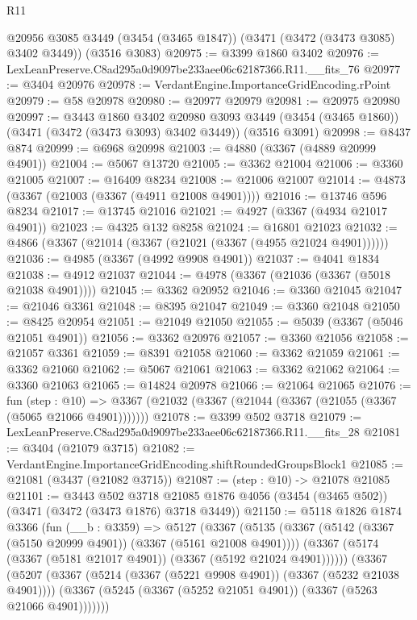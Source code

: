 \begin{lexlean}{R11}
\begin{coremodule}
    @20956
    @3085
    @3449
    (@3454 (@3465 @1847))
    (@3471 (@3472 (@3473 @3085) @3402 @3449))
    (@3516 @3083)
@20975 := @3399 @1860 @3402
@20976 := LexLeanPreserve.C8ad295a0d9097be233aee06c62187366.R11.__fits_76
@20977 := @3404 @20976
@20978 := VerdantEngine.ImportanceGridEncoding.rPoint
@20979 := @58 @20978
@20980 := @20977 @20979
@20981 := @20975 @20980
@20997 := @3443
    @1860
    @3402
    @20980
    @3093
    @3449
    (@3454 (@3465 @1860))
    (@3471 (@3472 (@3473 @3093) @3402 @3449))
    (@3516 @3091)
@20998 := @8437 @874
@20999 := @6968 @20998
@21003 := @4880 (@3367 (@4889 @20999 @4901))
@21004 := @5067 @13720
@21005 := @3362 @21004
@21006 := @3360 @21005
@21007 := @16409 @8234
@21008 := @21006 @21007
@21014 := @4873 (@3367 (@21003 (@3367 (@4911 @21008 @4901))))
@21016 := @13746 @596 @8234
@21017 := @13745 @21016
@21021 := @4927 (@3367 (@4934 @21017 @4901))
@21023 := @4325 @132 @8258
@21024 := @16801 @21023
@21032 := @4866 (@3367 (@21014 (@3367 (@21021 (@3367 (@4955 @21024 @4901))))))
@21036 := @4985 (@3367 (@4992 @9908 @4901))
@21037 := @4041 @1834
@21038 := @4912 @21037
@21044 := @4978 (@3367 (@21036 (@3367 (@5018 @21038 @4901))))
@21045 := @3362 @20952
@21046 := @3360 @21045
@21047 := @21046 @3361
@21048 := @8395 @21047
@21049 := @3360 @21048
@21050 := @8425 @20954
@21051 := @21049 @21050
@21055 := @5039 (@3367 (@5046 @21051 @4901))
@21056 := @3362 @20976
@21057 := @3360 @21056
@21058 := @21057 @3361
@21059 := @8391 @21058
@21060 := @3362 @21059
@21061 := @3362 @21060
@21062 := @5067 @21061
@21063 := @3362 @21062
@21064 := @3360 @21063
@21065 := @14824 @20978
@21066 := @21064 @21065
@21076 := fun (step : @10) =>
  @3367 (@21032 (@3367 (@21044 (@3367 (@21055 (@3367 (@5065 @21066 @4901)))))))
@21078 := @3399 @502 @3718
@21079 := LexLeanPreserve.C8ad295a0d9097be233aee06c62187366.R11.__fits_28
@21081 := @3404 (@21079 @3715)
@21082 := VerdantEngine.ImportanceGridEncoding.shiftRoundedGroupsBlock1
@21085 := @21081 (@3437 (@21082 @3715))
@21087 := (step : @10) -> @21078 @21085
@21101 := @3443
    @502
    @3718
    @21085
    @1876
    @4056
    (@3454 (@3465 @502))
    (@3471 (@3472 (@3473 @1876) @3718 @3449))
@21150 := @5118
    @1826
    @1874
    @3366
    (fun (__b : @3359) =>
    @5127
      (@3367
        (@5135
          (@3367 (@5142 (@3367 (@5150 @20999 @4901)) (@3367 (@5161 @21008 @4901))))
          (@3367 (@5174 (@3367 (@5181 @21017 @4901)) (@3367 (@5192 @21024 @4901))))))
      (@3367
        (@5207
          (@3367 (@5214 (@3367 (@5221 @9908 @4901)) (@3367 (@5232 @21038 @4901))))
          (@3367 (@5245 (@3367 (@5252 @21051 @4901)) (@3367 (@5263 @21066 @4901)))))))

\end{coremodule}
\end{lexlean}
